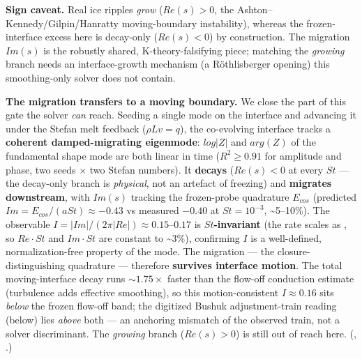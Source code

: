 \documentclass[11pt]{article}
\begin{document}
\textbf{Sign caveat.} Real ice ripples \emph{grow} ($Re(s)>0$, the Ashton–Kennedy/Gilpin/Hanratty moving-boundary instability), whereas the frozen-interface excess here is decay-only ($Re(s)<0$) by construction. The migration $Im(s)$ is the robustly shared, K-theory-falsifying piece; matching the \emph{growing} branch needs an interface-growth mechanism (a Röthlisberger opening) this smoothing-only solver does not contain.


\textbf{The migration transfers to a moving boundary.} We close the part of this gate the solver \emph{can} reach. Seeding a single mode on the interface and advancing it under the Stefan melt feedback ($\rho L v=q$), the co-evolving interface tracks a \textbf{coherent damped-migrating eigenmode}: $log|Z|$ and $arg(Z)$ of the fundamental shape mode are both linear in time ($R^{2}\ge 0.91$ for amplitude and phase, two seeds \ensuremath{\times} two Stefan numbers). It \textbf{decays} ($Re(s)<0$ at every $St$ — the decay-only branch is \emph{physical}, not an artefact of freezing) and \textbf{migrates downstream}, with $Im(s)$ tracking the frozen-probe quadrature $E_{cos}$ (predicted $Im=E_{cos}/(aSt)\approx -0.43$ vs measured $-0.40$ at $St=10^{-3}$, \textasciitilde{}5–10\%). The observable $I=|Im|/(2\pi |Re|)\approx 0.15–0.17$ is \textbf{$St$-invariant} (the rate scales as , so $Re\cdot St$ and $Im\cdot St$ are constant to \textasciitilde{}3\%), confirming $I$ is a well-defined, normalization-free property of the mode. The migration — the closure-distinguishing quadrature — therefore \textbf{survives interface motion}. The total moving-interface decay runs $\sim 1.75\times $ faster than the flow-off conduction estimate (turbulence adds effective smoothing), so this motion-consistent $I\approx 0.16$ sits \emph{below} the frozen flow-off band; the digitized Bushuk adjustment-train reading (below) lies \emph{above} both — an anchoring mismatch of the observed train, not a solver discriminant. The \emph{growing} branch ($Re(s)>0$) is still out of reach here. (, .)
\end{document}
